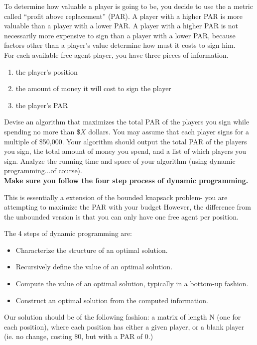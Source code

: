 \documentclass[addpoints,11pt]{exam}
\begin{document}
\begin{questions}
To determine how valuable a player is going to be, you decide to use the a metric called ``profit above replacement'' (PAR).  A player with a higher PAR is more valuable than a player with a lower PAR.  A player with a higher PAR is not necessarily more expensive to sign than a player with a lower PAR, because factors other than a player's value determine how must it costs to sign him.\\

For each available free-agent player, you have three pieces of information.
\begin{enumerate}
	\item the player's position
	\item the amount of money it will cost to sign the player
	\item the player's PAR
\end{enumerate} 

Devise an algorithm that maximizes the total PAR of the players you sign while spending no more than \$$X$ dollars.  You may assume that each player signs for a multiple of \$50,000.  Your algorithm should output the total PAR of the players you sign, the total amount of money you spend, and a list of which players you sign.  Analyze the running time and space of your algorithm (using dynamic programming...of course). \\

\textbf{Make sure you follow the four step process of dynamic programming.}


\begin{solutionorbox}

This is essentially a extension of the bounded knapsack problem- you are attempting to maximize the PAR with your budget However, the difference from the unbounded version is that you can only have one free agent per position.

The 4 steps of dynamic programming are: 
\begin{itemize}
    \item Characterize the structure of an optimal solution.
    \item Recursively define the value of an optimal solution.
    \item Compute the value of an optimal solution, typically in a bottom-up fashion.
    \item Construct an optimal solution from the computed information.
\end{itemize}

Our solution should be of the following fashion: a matrix of length N (one for each position), where each position has either a given player, or a blank player (ie. no change, costing \$0, but with a PAR of 0.) 


\end{solutionorbox}
\end{questions}
\end{document}
